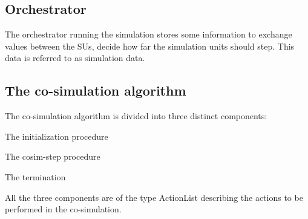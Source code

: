\subsection{Orchestrator}
The orchestrator running the simulation stores some information to exchange values between the SUs, decide how far the simulation units should step.
This data is referred to as simulation data.

\subsection{The co-simulation algorithm}
The co-simulation algorithm is divided into three distinct components: 
\begin{compactitem}
  \item The initialization procedure
  \item The cosim-step procedure 
  \item The termination
\end{compactitem}
All the three components are of the type ActionList describing the actions to be performed in the co-simulation.
